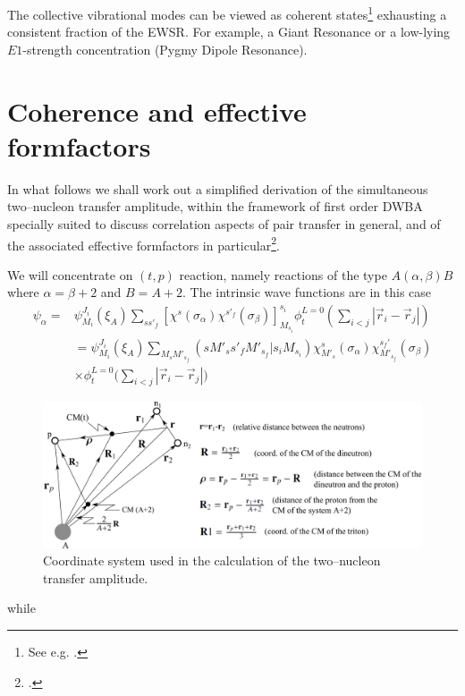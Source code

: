 \begin{subappendices}
 The collective vibrational modes can be viewed as  coherent states\footnote{See e.g. \cite{Glauber:69,Glauber:07}.} exhausting a consistent fraction of the EWSR. For example, a Giant Resonance or a low-lying $E1$-strength concentration (Pygmy Dipole Resonance). 
\section{Coherence and effective formfactors}\label{C7AppB}

In what follows we shall work out  a simplified derivation of the simultaneous two--nucleon transfer amplitude, within the framework of first order DWBA specially suited to discuss correlation aspects of pair transfer in general, and of the associated effective formfactors in particular\footnote{\cite{Glendenning:65,Bayman:67}.}. 


We will concentrate on $(t,p)$ reaction, namely reactions of the type $A(\alpha,\beta)B$ where $\alpha=\beta+2$ and $B=A+2$.
The intrinsic wave functions are in this case
\begin{equation}\label{5lec1}
\begin{split}
\psi_\alpha=& \psi_{M_i}^{J_i}(\xi_A) \sum_{s s'_f} \left[ \chi^s(\sigma_\alpha) \chi^{s'_f}(\sigma_\beta) \right] _{M_{s_i}}^{s_i}
\phi_t^{L=0}\left(\sum_{i<j}|\vec r_i-\vec r_j|\right)\\
&= \psi_{M_i}^{J_i}(\xi_A) \sum_{M_s M'_{s_f}} (s M'_{s} s'_f M'_{s_f}| s_i M_{s_i}) \chi^s_{M'_s}(\sigma_\alpha) \chi^{s_f'}_{M'_{s_f}}(\sigma_\beta)\\
& \times \phi_t^{L=0}\bigl(\sum_{i<j}|\vec r_i-\vec r_j|\bigr)
\end{split}
\end{equation}
 \begin{figure}[h!]
 	\begin{center}
\includegraphics*[width=\textwidth]{C7/figs_C7/coord}
\end{center}
\caption{Coordinate system used in the calculation of the two--nucleon transfer amplitude.}\label{fig_coord}
\end{figure}
while


\end{subappendices}
